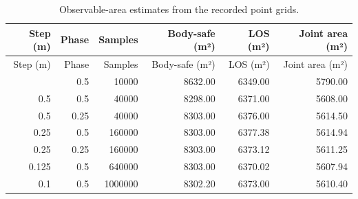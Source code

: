 \begin{longtable}{@{}rrrrrr@{}}
\caption{Observable-area estimates from the recorded point grids.}\\
\toprule
Step (m) & Phase & Samples & Body-safe (m²) & LOS (m²) & Joint area (m²)\\
\midrule
\endfirsthead
\toprule
Step (m) & Phase & Samples & Body-safe (m²) & LOS (m²) & Joint area (m²)\\
\midrule
\endhead
\bottomrule
\endlastfoot
1 & 0.5 & 10000 & 8632.00 & 6349.00 & 5790.00\\
0.5 & 0.5 & 40000 & 8298.00 & 6371.00 & 5608.00\\
0.5 & 0.25 & 40000 & 8303.00 & 6376.00 & 5614.50\\
0.25 & 0.5 & 160000 & 8303.00 & 6377.38 & 5614.94\\
0.25 & 0.25 & 160000 & 8303.00 & 6373.12 & 5611.25\\
0.125 & 0.5 & 640000 & 8303.00 & 6370.02 & 5607.94\\
0.1 & 0.5 & 1000000 & 8302.20 & 6373.00 & 5610.40\\
\end{longtable}
